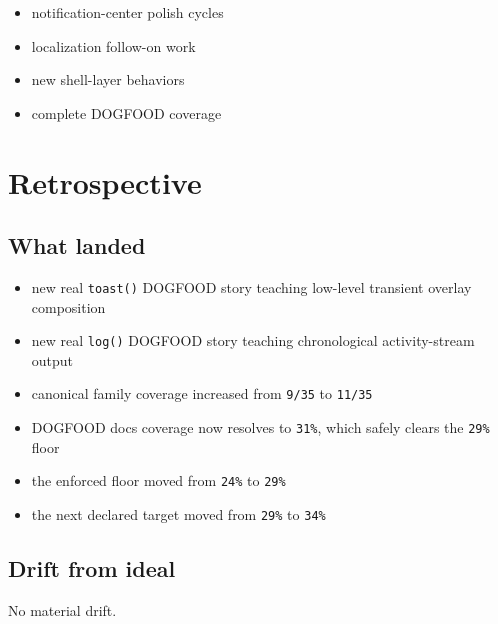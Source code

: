 \begin{itemize}
\tightlist
\item
  notification-center polish cycles
\item
  localization follow-on work
\item
  new shell-layer behaviors
\item
  complete DOGFOOD coverage
\end{itemize}

\section{Retrospective}\label{record-069-retrospective}

\subsection{What landed}\label{record-069-what-landed}

\begin{itemize}
\tightlist
\item
  new real \texttt{t\allowbreak{}o\allowbreak{}a\allowbreak{}s\allowbreak{}t\allowbreak{}(\allowbreak{})} DOGFOOD story teaching low-level transient overlay composition
\item
  new real \texttt{l\allowbreak{}o\allowbreak{}g\allowbreak{}(\allowbreak{})} DOGFOOD story teaching chronological activity-stream output
\item
  canonical family coverage increased from \texttt{9\allowbreak{}/\allowbreak{}3\allowbreak{}5} to \texttt{1\allowbreak{}1\allowbreak{}/\allowbreak{}3\allowbreak{}5}
\item
  DOGFOOD docs coverage now resolves to \texttt{3\allowbreak{}1\allowbreak{}\%}, which safely clears the \texttt{2\allowbreak{}9\allowbreak{}\%} floor
\item
  the enforced floor moved from \texttt{2\allowbreak{}4\allowbreak{}\%} to \texttt{2\allowbreak{}9\allowbreak{}\%}
\item
  the next declared target moved from \texttt{2\allowbreak{}9\allowbreak{}\%} to \texttt{3\allowbreak{}4\allowbreak{}\%}
\end{itemize}

\subsection{Drift from ideal}\label{record-069-drift-from-ideal}

No material drift.

